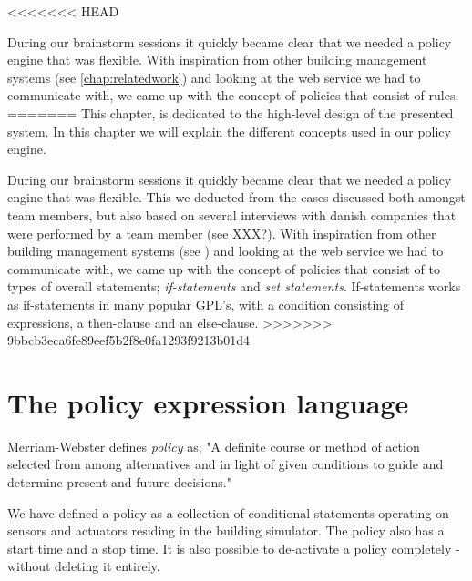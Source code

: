<<<<<<< HEAD

During our brainstorm sessions it quickly became clear that we needed a policy engine that was flexible. With inspiration from other building management systems (see \ref{chap:relatedwork}) and looking at the web service we had to communicate with, we came up with the concept of policies that consist of rules.
=======
This chapter, is dedicated to the high-level design of the presented system. In this chapter we will explain the different concepts used in our policy engine. 

During our brainstorm sessions it quickly became clear that we needed a policy engine that was flexible. This we deducted from the cases discussed both amongst team members, but also based on several interviews with danish companies that were performed by a team member (see XXX?). With inspiration from other building management systems (see ) and looking at the web service we had to communicate with, we came up with the concept of policies that consist of to types of overall statements; \textit{if-statements} and \textit{set statements}. If-statements works as if-statements in many popular GPL's, with a condition consisting of expressions, a then-clause and an else-clause.
>>>>>>> 9bbcb3eca6fe89eef5b2f8e0fa1293f9213b01d4

\section{The policy expression language}
Merriam-Webster defines \textit{policy} as; "A definite course or method of action selected from among alternatives and in light of given conditions to guide and determine present and future decisions."

We have defined a policy as a collection of conditional statements operating on sensors and actuators residing in the building simulator. The policy also has a start time and a stop time. It is also possible to de-activate a policy completely - without deleting it entirely.

